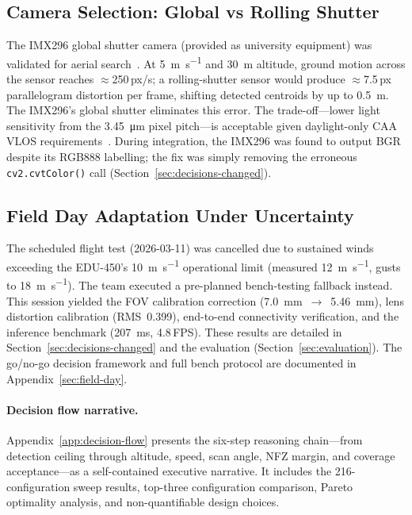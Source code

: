 \subsection{Camera Selection: Global vs Rolling Shutter}\label{sec:camera-rationale}

The IMX296 global shutter camera (provided as university equipment) was validated for aerial search~\cite{imx296, sukhatme2012rolling_global}. At \SI{5}{\metre\per\second} and \SI{30}{\metre} altitude, ground motion across the sensor reaches ${\approx}$250\,px/s; a rolling-shutter sensor would produce ${\approx}$7.5\,px parallelogram distortion per frame, shifting detected centroids by up to \SI{0.5}{\metre}. The IMX296's global shutter eliminates this error. The trade-off---lower light sensitivity from the \SI{3.45}{\micro\metre} pixel pitch---is acceptable given daylight-only CAA VLOS requirements~\cite{caa2024uas}. During integration, the IMX296 was found to output BGR despite its RGB888 labelling; the fix was simply removing the erroneous \texttt{cv2.cvtColor()} call (Section~\ref{sec:decisions-changed}).

\subsection{Field Day Adaptation Under Uncertainty}\label{sec:weather-rationale}

The scheduled flight test (2026-03-11) was cancelled due to sustained winds exceeding the EDU-450's \SI{10}{\metre\per\second} operational limit (measured \SI{12}{\metre\per\second}, gusts to \SI{18}{\metre\per\second}). The team executed a pre-planned bench-testing fallback instead. This session yielded the FOV calibration correction (\SI{7.0}{\milli\metre}~$\rightarrow$~\SI{5.46}{\milli\metre}), lens distortion calibration (RMS~0.399), end-to-end connectivity verification, and the inference benchmark (\SI{207}{\milli\second}, 4.8\,FPS). These results are detailed in Section~\ref{sec:decisions-changed} and the evaluation (Section~\ref{sec:evaluation}). The go/no-go decision framework and full bench protocol are documented in Appendix~\ref{sec:field-day}.

\paragraph{Decision flow narrative.} Appendix~\ref{app:decision-flow} presents the six-step reasoning chain---from detection ceiling through altitude, speed, scan angle, NFZ margin, and coverage acceptance---as a self-contained executive narrative. It includes the 216-configuration sweep results, top-three configuration comparison, Pareto optimality analysis, and non-quantifiable design choices.

